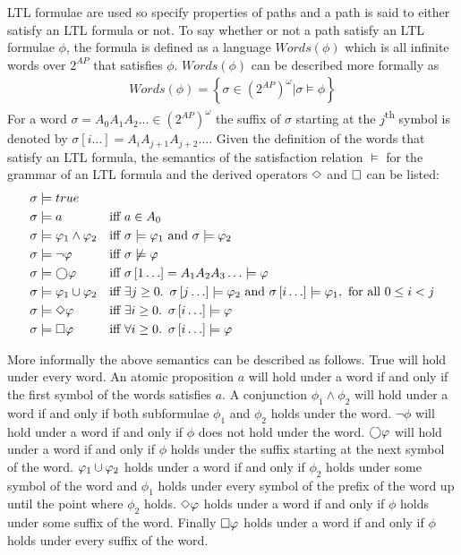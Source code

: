 LTL formulae are used so specify properties of paths and a path is said to either satisfy an LTL formula or not.  To say whether or not a path satisfy an LTL formulae $\phi$, the formula is defined as a language $Words(\phi)$ which is all infinite words over $2^{AP}$ that satisfies $\phi$. $Words(\phi)$ can be described more formally as
\begin{align*}
    Words(\phi) = \left\{ \sigma \in \left( 2^{AP} \right)^\omega | \sigma \models \phi \right\}
\end{align*}
For a word $\sigma = A_0 A_1 A_2 \ldots \in \left( 2^{AP} \right)^\omega$ the suffix of $\sigma$ starting at the $j$\textsuperscript{th} symbol is denoted by $\sigma \left[ i \ldots \right] = A_i A_{j+1} A_{j+2} \ldots$. Given the definition of the words that satisfy an LTL formula, the semantics of the satisfaction relation $\models$ for the grammar of an LTL formula and the derived operators $\Diamond$ and $\square$ can be listed:
\begin{align*}
    \sigma &\models true                &&\\
    \sigma &\models a                   &\text{iff }& a \in A_0 \\
    \sigma &\models \varphi_1 \land \varphi_2 &\text{iff }& \sigma \models \varphi_1 \text{ and } \sigma \models \varphi_2 \\
    \sigma &\models \lnot \varphi          &\text{iff }& \sigma \not\models \varphi\\
    \sigma &\models \bigcirc \varphi             &\text{iff }& \sigma\left[1\ldots\right] = A_1 A_2 A_3\ldots \models \varphi\\
    \sigma &\models \varphi_1 \cup \varphi_2    &\text{iff }& \exists j \geq 0.\enskip \sigma\left[j\ldots\right] \models \varphi_2 \text{ and } \sigma\left[i\ldots\right] \models \varphi_1, \text{ for all } 0 \leq i < j \\
    \sigma &\models \Diamond \varphi             &\text{iff }& \exists i \geq 0.\enskip \sigma\left[i\ldots\right] \models \varphi \\
    \sigma &\models \square \varphi             &\text{iff }& \forall i \geq 0.\enskip \sigma\left[i\ldots\right] \models \varphi
\end{align*}

More informally the above semantics can be described as follows. True will hold under every word. An atomic proposition $a$ will hold under a word if and only if the first symbol of the words satisfies $a$. A conjunction $\phi_1 \land \phi_2$ will hold under a word if and only if both subformulae $\phi_1$ and $\phi_2$ holds under the word. $\lnot \phi$ will hold under a word if and only if $\phi$ does not hold under the word. $\bigcirc\varphi$ will hold under a word if and only if $\phi$ holds under the suffix starting at the next symbol of the word. $\varphi_1 \cup \varphi_2$ holds under a word if and only if $\phi_2$ holds under some symbol of the word and $\phi_1$ holds under every symbol of the prefix of the word up until the point where $\phi_2$ holds. $\Diamond \varphi$ holds under a word if and only if $\phi$ holds under some suffix of the word. Finally $\square \varphi$ holds under a word if and only if $\phi$ holds under every suffix of the word.


